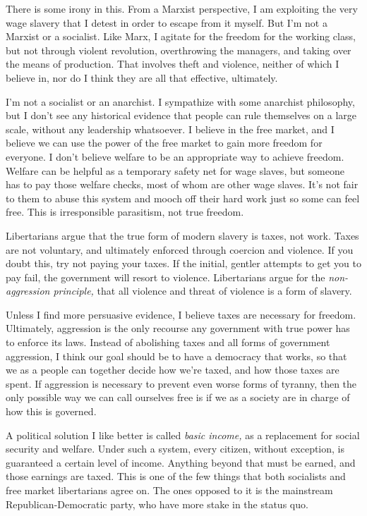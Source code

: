 There is some irony in this. From a Marxist perspective, I am exploiting the very wage slavery that I detest in order to escape from it myself. But I'm not a Marxist or a socialist. Like Marx, I agitate for the freedom for the working class, but not through violent revolution, overthrowing the managers, and taking over the means of production. That involves theft and violence, neither of which I believe in, nor do I think they are all that effective, ultimately.

I'm not a socialist or an anarchist. I sympathize with some anarchist philosophy, but I don't see any historical evidence that people can rule themselves on a large scale, without any leadership whatsoever. I believe in the free market, and I believe we can use the power of the free market to gain more freedom for everyone. I don't believe welfare to be an appropriate way to achieve freedom. Welfare can be helpful as a temporary safety net for wage slaves, but someone has to pay those welfare checks, most of whom are other wage slaves. It's not fair to them to abuse this system and mooch off their hard work just so some can feel free. This is irresponsible parasitism, not true freedom.

Libertarians argue that the true form of modern slavery is taxes, not work. Taxes are not voluntary, and ultimately enforced through coercion and violence. If you doubt this, try not paying your taxes. If the initial, gentler attempts to get you to pay fail, the government will resort to violence. Libertarians argue for the \emph{non-aggression principle,} that all violence and threat of violence is a form of slavery.

Unless I find more persuasive evidence, I believe taxes are necessary for freedom. Ultimately, aggression is the only recourse any government with true power has to enforce its laws. Instead of abolishing taxes and all forms of government aggression, I think our goal should be to have a democracy that works, so that we as a people can together decide how we're taxed, and how those taxes are spent. If aggression is necessary to prevent even worse forms of tyranny, then the only possible way we can call ourselves free is if we as a society are in charge of how this is governed.

A political solution I like better is called \emph{basic income,} as a replacement for social security and welfare. Under such a system, every citizen, without exception, is guaranteed a certain level of income. Anything beyond that must be earned, and those earnings are taxed. This is one of the few things that both socialists and free market libertarians agree on. The ones opposed to it is the mainstream Republican-Democratic party, who have more stake in the status quo.

